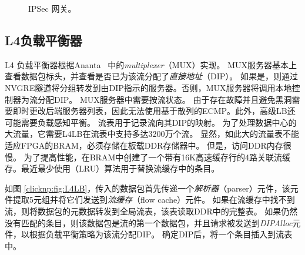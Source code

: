 \begin{figure}[htbp]
	\centering
	
	\caption{IPSec 网关。}
	
	\label{clicknp:fig:IPSec}
\end{figure}



\subsection{L4负载平衡器}
L4 负载平衡器根据Ananta~ \cite {ananta}中的\textit {multiplexer}（MUX）实现。
MUX服务器基本上查看数据包标头，并查看是否已为该流分配了\textit {直接地址}（DIP）。
如果是，则通过NVGRE隧道将分组转发到由DIP指示的服务器。否则，MUX服务器将调用本地控制器为流分配DIP。
MUX服务器中需要按流状态。
由于存在故障并且避免黑洞需要即时更改后端服务器列表，因此无法使用基于散列的ECMP。此外，高级LB还可能需要负载感知平衡。
流表用于记录流向其DIP的映射。
为了处理数据中心的大流量，它需要L4LB在流表中支持多达3200万个流。
显然，如此大的流量表不能适应FPGA的BRAM，必须存储在板载DDR存储器中。
但是，访问DDR内存很慢。
为了提高性能，在BRAM中创建了一个带有16K高速缓存行的4路关联流缓存。最近最少使用（LRU）算法用于替换流缓存中的条目。

如图 \ref{clicknp:fig:L4LB}，传入的数据包首先传递一个\textit {解析器}（parser）元件，该元件提取5元组并将它们发送到\textit {流缓存}（flow cache）元件。
如果在流缓存中找不到流，则将数据包的元数据转发到全局流表，该表读取DDR中的完整表。
如果仍然没有匹配的条目，则该数据包是流的第一个数据包，并且请求被发送到\textit {DIPAlloc}元件，以根据负载平衡策略为该流分配DIP。
确定DIP后，将一个条目插入到流表中。

